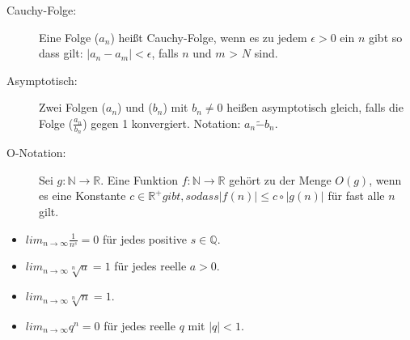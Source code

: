 \begin{description}
  \item [Cauchy-Folge:]
    Eine Folge ($a_n$) heißt Cauchy-Folge, wenn es zu jedem $\epsilon > 0$ ein
    $n$ gibt so dass gilt: $|a_n -a_m| < \epsilon$, falls $n$ und $m$ > $N$ sind.

  \item [Asymptotisch:]
    Zwei Folgen ($a_n$) und ($b_n$) mit $b_n \neq 0$ heißen asymptotisch gleich,
    falls die Folge ($\frac{a_n}{b_n}$) gegen 1 konvergiert. Notation: 
    $a_n \tilde{-} b_n$.

  \item [O-Notation:]
    Sei $g : \mathbb{N} \rightarrow \mathbb{R}$. Eine Funktion 
    $f : \mathbb{N} \rightarrow \mathbb{R}$ gehört zu der Menge $O(g)$, wenn es
    eine Konstante $c \in \mathbb{R}^+ gibt, so dass |f(n)| \leq c \circ |g(n)|$
    für fast alle $n$ gilt.
\end{description}


\begin{framed} 
  \begin{itemize}
    \item $lim_{n\rightarrow \infty} \frac{1}{n^s} = 0$ für jedes positive $s \in \mathbb{Q}$.
    \item $lim_{n\rightarrow \infty} \sqrt[n]{a} = 1$ für jedes reelle $a > 0$.
    \item $lim_{n\rightarrow \infty} \sqrt[n]{n} = 1$.
    \item $lim_{n\rightarrow \infty} q^n = 0$ für jedes reelle $q$ mit $|q| < 1$.
  \end{itemize}
\end{framed}


%	
%	
